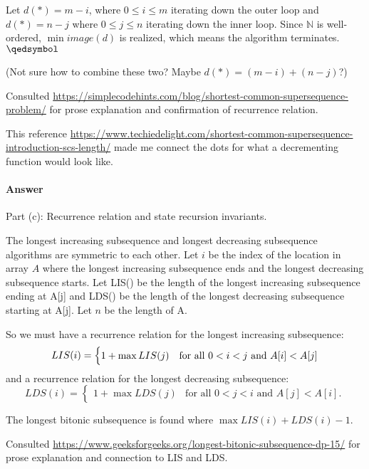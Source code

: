 \documentclass{article}
\begin{document}
Let $d(*) =  m - i$, where $0 \leq i \leq m$ iterating down the outer loop and $d(*) = n - j$ where $0 \leq j \leq n$ iterating down the inner loop. Since $\mathbb{N}$ is well-ordered, $\min{image(d)}$ is realized, which means the algorithm terminates. $\qedsymbol$

(Not sure how to combine these two? Maybe $d(*) = (m - i) + (n - j)$?)

Consulted \url{https://simplecodehints.com/blog/shortest-common-supersequence-problem/} for prose explanation and confirmation of recurrence relation. 

This reference \url{https://www.techiedelight.com/shortest-common-supersequence-introduction-scs-length/} made me connect the dots for what a decrementing function would look like. 

\newpage
\paragraph{Answer}{Part (c): Recurrence relation and state recursion invariants.}

The longest increasing subsequence and longest decreasing subsequence algorithms are symmetric to each other. Let $i$ be the index of the location in array $A$ where the longest increasing subsequence ends and the longest decreasing subsequence starts. Let LIS() be the length of the longest increasing subsequence ending at A[j] and LDS() be the length of the longest decreasing subsequence starting at A[j]. Let $n$ be the length of A. 

So we must have a recurrence relation for the longest increasing subsequence: 
\begin{equation}
LIS(i) = 
\begin{cases}
1 + \max{LIS(j)} & \text{for all $ 0 < i < j$ and $A[i] < A[j]$}\\
\end{cases}
\end{equation}
and a recurrence relation for the longest decreasing subsequence:
\begin{equation}
LDS(i) = 
\begin{cases}
1 + \max{LDS(j)} & \text{for all $0 < j < i$ and $A[j] < A[i]$.}
\end{cases}
\end{equation}

The longest bitonic subsequence is found where $\max{LIS(i)+LDS(i)-1}$.

Consulted \url{https://www.geeksforgeeks.org/longest-bitonic-subsequence-dp-15/}  for prose explanation and connection to LIS and LDS. 
\end{document}
